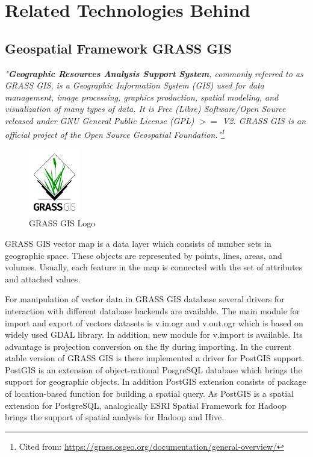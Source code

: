 \documentclass[a4paper,12pt,oneside]{report}
\begin{document}
	
	\section{Related Technologies Behind}
	\subsection{Geospatial Framework GRASS GIS}
	
	\textit{"\textbf{Geographic Resources Analysis Support System}, 
		commonly referred to as GRASS GIS, is a Geographic Information System (GIS) used
		for data management, image processing, graphics production, 
		spatial modeling, and visualization of many types of data. It is Free (Libre)
		Software/Open Source released under GNU General Public License 
		(GPL) $>=$ V2. GRASS GIS is an official project of the Open Source Geospatial
		Foundation."\footnote{Cited from:
			\url{https://grass.osgeo.org/documentation/general-overview/}}}
	
	\begin{figure}[!htbp]
		\centering
		\includegraphics[width=0.2\textwidth]{./img/grasslogo.png}
		\caption[GRASS GIS Logo ]{\centering GRASS GIS Logo}
	\end{figure}   

	GRASS GIS vector map is a data layer which consists of number sets in
	geographic space. These objects are represented by points, lines, areas, and volumes. Usually,
	each feature in the map is  connected with the set of attributes and attached  values.
	
	For manipulation of vector data in GRASS GIS database several drivers for interaction with different database backends are available. The main module for import and export of vectors datasets is
	v.in.ogr and v.out.ogr which is based on widely used GDAL library. In addition, new module for v.import is available. Its advantage is projection conversion on the fly during importing.
	In the current stable version of GRASS GIS is there implemented a driver for PostGIS
	support. PostGIS is an extension of object-rational PosgreSQL database which brings the support for
	geographic objects. In addition PostGIS extension consists of package of 
	location-based function for building a spatial query.  
	As PostGIS is a spatial extension for PostgreSQL, analogically ESRI Spatial
	Framework for Hadoop brings the support of spatial analysis for Hadoop and  Hive.
	
\end{document}
